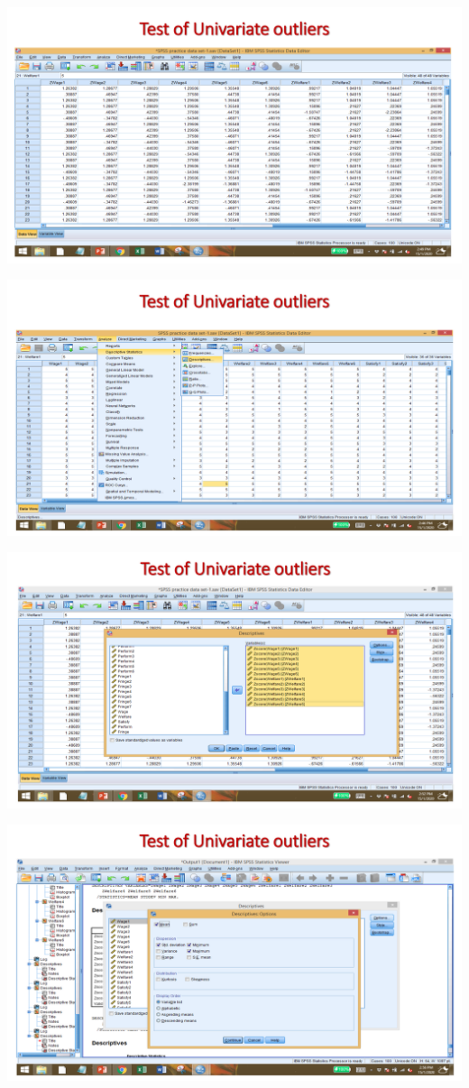 \documentclass[
  letterpaper,
  DIV=11,
  numbers=noendperiod]{scrreprt}
\begin{document}
\includegraphics{images/slides/img_Page_042.png}

\includegraphics{images/slides/img_Page_043.png}

\includegraphics{images/slides/img_Page_044.png}

\includegraphics{images/slides/img_Page_045.png}
\end{document}
